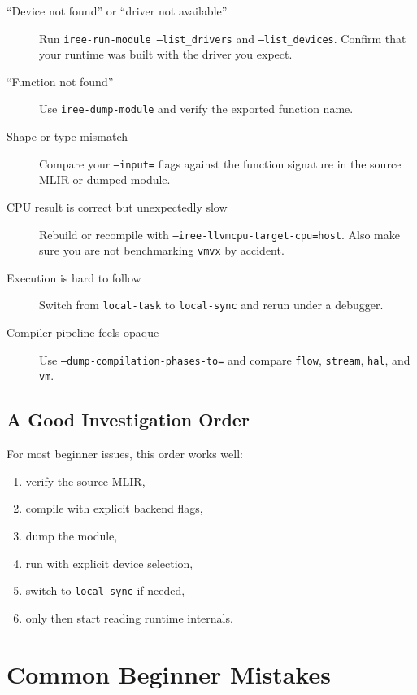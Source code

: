 \documentclass[11pt,a4paper]{article}
\begin{document}
\begin{description}
    \item[``Device not found'' or ``driver not available''] Run \texttt{iree-run-module --list\_drivers} and \texttt{--list\_devices}. Confirm that your runtime was built with the driver you expect.
    \item[``Function not found''] Use \texttt{iree-dump-module} and verify the exported function name.
    \item[Shape or type mismatch] Compare your \texttt{--input=} flags against the function signature in the source MLIR or dumped module.
    \item[CPU result is correct but unexpectedly slow] Rebuild or recompile with \texttt{--iree-llvmcpu-target-cpu=host}. Also make sure you are not benchmarking \texttt{vmvx} by accident.
    \item[Execution is hard to follow] Switch from \texttt{local-task} to \texttt{local-sync} and rerun under a debugger.
    \item[Compiler pipeline feels opaque] Use \texttt{--dump-compilation-phases-to=} and compare \texttt{flow}, \texttt{stream}, \texttt{hal}, and \texttt{vm}.
\end{description}

\subsection{A Good Investigation Order}

For most beginner issues, this order works well:
\begin{enumerate}
    \item verify the source MLIR,
    \item compile with explicit backend flags,
    \item dump the module,
    \item run with explicit device selection,
    \item switch to \texttt{local-sync} if needed,
    \item only then start reading runtime internals.
\end{enumerate}

\section{Common Beginner Mistakes}
\end{document}
